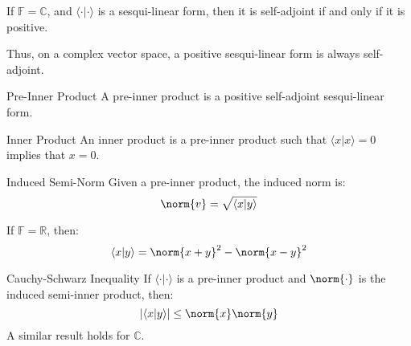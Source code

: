 \documentclass[crop=false,class=book,oneside]{standalone}                      %
\begin{document}
        \begin{theorem}
            If $\mathbb{F}=\mathbb{C}$, and
            $\langle{\cdot|\cdot}\rangle$ is a sesqui-linear
            form, then it is self-adjoint if and only if
            it is positive.
        \end{theorem}
        Thus, on a complex vector space, a positive sesqui-linear
        form is always self-adjoint.
        \begin{ldefinition}{Pre-Inner Product}
            A pre-inner product is a positive self-adjoint
            sesqui-linear form.
        \end{ldefinition}
        \begin{ldefinition}{Inner Product}
            An inner product is a pre-inner product such that
            $\langle{x|x}\rangle=0$ implies that $x=0$.
        \end{ldefinition}
        \begin{ldefinition}{Induced Semi-Norm}
            Given a pre-inner product, the induced norm is:
            \begin{equation}
                \norm{v}=\sqrt{\langle{x|y}\rangle}
            \end{equation}
        \end{ldefinition}
        If $\mathbb{F}=\mathbb{R}$, then:
        \begin{equation}
            \langle{x|y}\rangle=\norm{x+y}^{2}-\norm{x-y}^{2}
        \end{equation}
        \begin{ltheorem}{Cauchy-Schwarz Inequality}
            If $\langle{\cdot|\cdot}\rangle$ is a pre-inner product
            and $\norm{\cdot}$ is the induced semi-inner product,
            then:
            \begin{equation}
                |\langle{x|y}\rangle|\leq\norm{x}\norm{y}
            \end{equation}
            A similar result holds for $\mathbb{C}$.
        \end{ltheorem}
\end{document}
